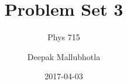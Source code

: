 \documentclass[11pt]{article}
\title{Problem Set 3}
\subtitle{Phys 715}
\date{2017-04-03}
\author{Deepak Mallubhotla}
\newcommand{\onlyinsubfile}[1]{#1}
\newcommand{\notinsubfile}[1]{}
\begin{document}
\renewcommand{\onlyinsubfile}[1]{}
\renewcommand{\notinsubfile}[1]{#1}

\lstset{inputpath=./problems/Prob1/}

\maketitle
\graphicspath{{./images}{./problems/Prob1/images/}}













\end{document}
